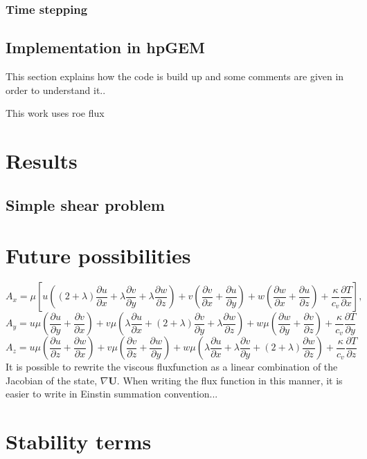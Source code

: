 \documentclass{report}
\newcommand{\dx}[1]{\frac{\partial #1}{\partial x}}
\newcommand{\dy}[1]{\frac{\partial #1}{\partial y}}
\newcommand{\dz}[1]{\frac{\partial #1}{\partial z}}
\begin{document}
\subsection{Time stepping}


\section{Implementation in hpGEM}
This section explains how the code is build up and some comments are given in order to understand it..

This work uses roe flux

\chapter{Results}
\section{Simple shear problem}

\chapter{Future possibilities}

\begin{equation}
\label{e:energyBalance_AxLong}
A_x = \mu \left [
u \left( (2+\lambda)\dx{u} + \lambda \dy{v} + \lambda \dz{w} \right)
+ v \left( \dx{v} + \dy{u} \right) 
+ w \left( \dx{w} + \dz{u} \right)
+ \frac{\kappa}{c_v} \dx{T}
\right],
\end{equation}
\begin{equation}
\label{e:energyBalance_AyLong}
A_y = u \mu \left( \dy{u} + \dx{v} \right)
+ v \mu \left( \lambda \dx{u} + (2+\lambda)\dy{v} + \lambda \dz{w} \right)
+ w \mu \left( \dy{w} + \dz{v} \right)
+ \frac{\kappa}{c_v}\dy{T}
\end{equation}
\begin{equation}
\label{e:energyBalance_AzLong}
A_z = u \mu \left( \dz{u} + \dx{w} \right)
+ v \mu \left( \dz{v} + \dy{w} \right)
+ w \mu \left( \lambda\dx{u} + \lambda\dy{v} + (2+\lambda)\dz{w} \right)
+ \frac{\kappa}{c_v}\dz{T}
\end{equation}
It is possible to rewrite the viscous fluxfunction as a linear combination of the Jacobian of the state, $\nabla \mathbf{U}$. When writing the flux function in this manner, it is easier to write in Einstin summation convention...

\chapter{Stability terms}


\end{document}
